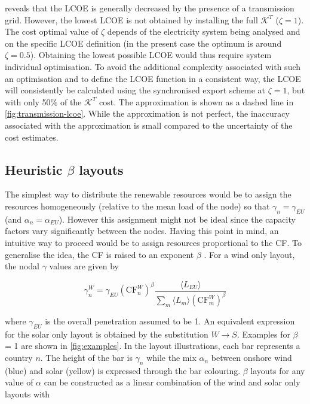 \documentclass[a4paper, 5p, sort&compress]{elsarticle}%
\newcommand{\paren}[1]{\left(#1\right)}
\begin{document}
 reveals that the LCOE is generally
decreased by the presence of a transmission grid. However, the lowest
LCOE is not obtained by installing the full $\mathcal{K}^{T}$
($\zeta = 1$). The cost optimal value of $\zeta$ depends of the electricity
system being analysed and on the specific LCOE definition (in the
present case the optimum is around $\zeta= 0.5$). Obtaining the lowest
possible LCOE would thus require system individual optimisation. To
avoid the additional complexity associated with such an optimisation
and to define the LCOE function in a consistent way, the LCOE will
consistently be calculated using the synchronised export scheme at
$\zeta=1$, but with only 50\% of the $\mathcal{K}^{T}$ cost. The
approximation is shown as a dashed line in
\cref{fig:transmission-lcoe}. While the approximation is not perfect,
the inaccuracy associated with the approximation is small
compared to the uncertainty of the cost estimates.

\subsection{Heuristic $\beta$ layouts}
\label{sec:beta-layout}

The simplest way to distribute the renewable resources would be to
assign the resources homogeneously (relative to the mean load of the
node) so that $\gamma_{n} = \gamma_{EU}$ (and $\alpha_{n} = \alpha_{EU}$). However this assignment
might not be ideal since the capacity factors vary significantly
between the nodes. Having this point in mind, an intuitive way to
proceed would be to assign resources proportional to the CF. To
generalise the idea, the CF is raised to an exponent $\beta$ %
\cite{Rolando}. For a wind only layout, the nodal $\gamma$ values are given by

\begin{equation}
  \label{eq:8}
  \gamma_{n}^{W} = \gamma_{EU} \paren{\text{CF}^{W}_{n}}^{\beta} \frac{\langle L_{EU}
    \rangle}{\sum_{m} \langle L_{m}
    \rangle \paren{\text{CF}^{W}_{m}}^{\beta}}
\end{equation}

where $\gamma_{EU}$ is the overall penetration assumed to be 1. An equivalent
expression for the solar only layout is obtained by the substitution
$W \to S$. Examples for $\beta$ = 1 are shown in \cref{fig:examples}. In
the layout illustrations, each bar represents a country $n$. The
height of the bar is $\gamma_{n}$ while the mix $\alpha_{n}$ between onshore
wind (blue) and solar (yellow) is expressed through the bar
colouring. $\beta$ layouts for any value of $\alpha$ can be constructed as a
linear combination of the wind and solar only layouts with
\end{document}
